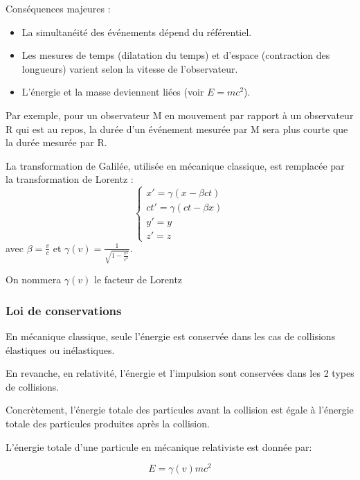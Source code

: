 \documentclass[14pt]{article}
\begin{document}
Conséquences majeures :
\begin{itemize}
    \item La simultanéité des événements dépend du référentiel.
    \item Les mesures de temps (dilatation du temps) et d'espace (contraction des longueurs) varient selon la vitesse de l'observateur.
    \item L'énergie et la masse deviennent liées (voir $E=mc^2$).
\end{itemize}

Par exemple, pour un observateur M en mouvement par rapport à un observateur R qui est au repos, la durée d'un événement mesurée par M sera plus courte que la durée mesurée par R. 

La transformation de Galilée, utilisée en mécanique classique, est remplacée par la transformation de Lorentz :
\begin{equation} \label{eq:2.1}
    \begin{cases}
        x' = \gamma (x - \beta c t) \\
        c t' = \gamma (c t - \beta x) \\
        y' = y \\
        z' = z
    \end{cases}
    \tag{2.1}
\end{equation}
avec $\beta = \frac{v}{c}$ et $\gamma(v) = \frac{1}{\sqrt{1 - \frac{v^2}{c^2}}}$.
\vspace{1em}

On nommera $\gamma(v)$ le facteur de Lorentz

\subsubsection{Loi de conservations}

En mécanique classique, seule l'énergie est conservée dans les cas de collisions élastiques ou inélastiques.

En revanche, en relativité, l'énergie et l'impulsion sont conservées dans les 2 types de collisions.

Concrètement, l'énergie totale des particules avant la collision est égale à l'énergie totale des particules produites après la collision.

L'énergie totale d'une particule en mécanique relativiste est donnée par:

\begin{equation} \label{eq:2.2}
    E = \gamma(v) m c^2
    \tag{2.2}
\end{equation}
\end{document}
